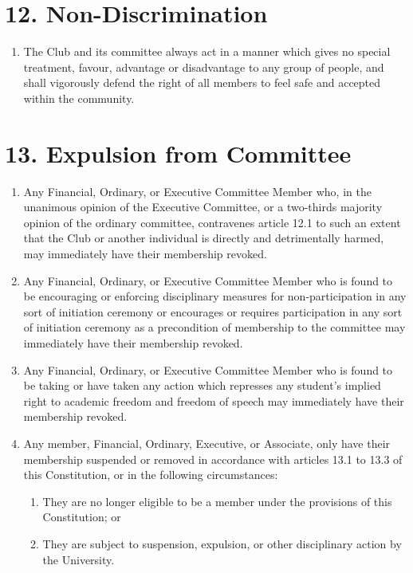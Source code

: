 \documentclass[12pt]{article}
\begin{document}
\section{12. Non-Discrimination}
\begin{enumerate}[label=12.\arabic*]
 \item The Club and its committee always act in a manner which gives no special treatment, favour, advantage or disadvantage to any group of people, and shall vigorously defend the right of all members to feel safe and accepted within the community.
\end{enumerate}

\section{13. Expulsion from Committee}
\begin{enumerate}[label=13.\arabic*]
\item Any Financial, Ordinary, or Executive Committee Member who, in the unanimous opinion of the Executive Committee, or a two-thirds majority opinion of the ordinary committee, contravenes article 12.1 to such an extent that the Club or another individual is directly and detrimentally harmed, may immediately have their membership revoked.
\item Any Financial, Ordinary, or Executive Committee Member who is found to be encouraging or enforcing disciplinary measures for non-participation in any sort of initiation ceremony or encourages or requires participation in any sort of initiation ceremony as a precondition of membership to the committee may immediately have their membership revoked.
\item Any Financial, Ordinary, or Executive Committee Member who is found to be taking or have taken any action which represses any student's implied right to academic freedom and freedom of speech may immediately have their membership revoked.
\item Any member, Financial, Ordinary, Executive, or Associate, only have their membership suspended or removed in accordance with articles 13.1 to 13.3 of this Constitution, or in the following circumstances:
    \begin{enumerate}[label=\theenumi.\arabic*]
        \item They are no longer eligible to be a member under the provisions of this Constitution; or
        \item They are subject to suspension, expulsion, or other disciplinary action by the University.
    \end{enumerate}
\end{enumerate}
\end{document}
